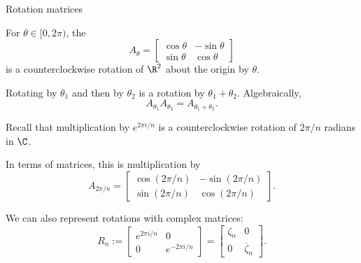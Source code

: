 \documentclass[8pt, handout]{beamer}
\newcommand{\Pause}{}
\begin{document}
\begin{frame}{Rotation matrices}

  For $\theta\in[0,2\pi)$, the  
  \[
  A_\theta=\begin{bmatrix}\cos\theta&-\sin\theta \\ \sin\theta & \cos\theta
  \end{bmatrix}
  \]
  is a counterclockwise rotation of $\R^2$ about the origin by
  $\theta$. \medskip\Pause

  Rotating by $\theta_1$ and then by $\theta_2$ is a rotation by
  $\theta_1+\theta_2$. \Pause Algebraically,
  \[
  A_{\theta_1}A_{\theta_2}=A_{\theta_1+\theta_2}.
  \]

  \Pause
  
  Recall that multiplication by $e^{2\pi i/n}$ is a counterclockwise
  rotation of $2\pi/n$ radians in $\C$. \medskip\Pause

  In terms of matrices, this is multiplication by
  \[
  A_{2\pi/n}=\begin{bmatrix}\cos(2\pi/n)&-\sin(2\pi/n)
  \\ \sin(2\pi/n) & \cos(2\pi/n)\end{bmatrix}.
  \]

  \Pause
  
  We can also represent rotations with complex matrices: 
  \[
  R_n:=\begin{bmatrix}e^{2\pi i/n} & 0 \\ 0 & e^{-2\pi i/n}\end{bmatrix}
  =\begin{bmatrix}\zeta_n & 0 \\ 0 & \overline{\zeta}_n\end{bmatrix}. 
  \]
  
\end{frame}

\end{document}
